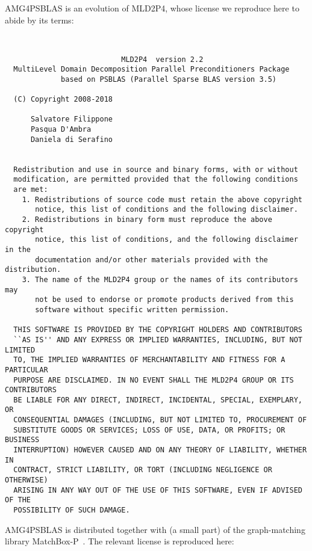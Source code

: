 \newpage
 AMG4PSBLAS is an evolution of MLD2P4, whose license we reproduce here
 to abide by its terms: {\small
\begin{verbatim}


                           MLD2P4  version 2.2
  MultiLevel Domain Decomposition Parallel Preconditioners Package
             based on PSBLAS (Parallel Sparse BLAS version 3.5)

  (C) Copyright 2008-2018

      Salvatore Filippone
      Pasqua D'Ambra
      Daniela di Serafino


  Redistribution and use in source and binary forms, with or without
  modification, are permitted provided that the following conditions
  are met:
    1. Redistributions of source code must retain the above copyright
       notice, this list of conditions and the following disclaimer.
    2. Redistributions in binary form must reproduce the above copyright
       notice, this list of conditions, and the following disclaimer in the
       documentation and/or other materials provided with the distribution.
    3. The name of the MLD2P4 group or the names of its contributors may
       not be used to endorse or promote products derived from this
       software without specific written permission.

  THIS SOFTWARE IS PROVIDED BY THE COPYRIGHT HOLDERS AND CONTRIBUTORS
  ``AS IS'' AND ANY EXPRESS OR IMPLIED WARRANTIES, INCLUDING, BUT NOT LIMITED
  TO, THE IMPLIED WARRANTIES OF MERCHANTABILITY AND FITNESS FOR A PARTICULAR
  PURPOSE ARE DISCLAIMED. IN NO EVENT SHALL THE MLD2P4 GROUP OR ITS CONTRIBUTORS
  BE LIABLE FOR ANY DIRECT, INDIRECT, INCIDENTAL, SPECIAL, EXEMPLARY, OR
  CONSEQUENTIAL DAMAGES (INCLUDING, BUT NOT LIMITED TO, PROCUREMENT OF
  SUBSTITUTE GOODS OR SERVICES; LOSS OF USE, DATA, OR PROFITS; OR BUSINESS
  INTERRUPTION) HOWEVER CAUSED AND ON ANY THEORY OF LIABILITY, WHETHER IN
  CONTRACT, STRICT LIABILITY, OR TORT (INCLUDING NEGLIGENCE OR OTHERWISE)
  ARISING IN ANY WAY OUT OF THE USE OF THIS SOFTWARE, EVEN IF ADVISED OF THE
  POSSIBILITY OF SUCH DAMAGE.

\end{verbatim}
   }
\pagebreak
AMG4PSBLAS is distributed together with (a small part) of the graph-matching
library MatchBox-P~\cite{MatchBoxP}. The relevant license is
reproduced here:
